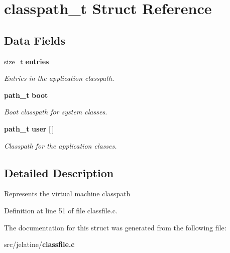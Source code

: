 \section{classpath\_\-t Struct Reference}
\label{structclasspath__t}
\subsection*{Data Fields}
\begin{DoxyCompactItemize}
\item 
size\_\-t {\bf entries}\label{structclasspath__t_ad21b3dca8d33e8d603933b3ad177163b}

\begin{DoxyCompactList}\small\item\em Entries in the application classpath. \item\end{DoxyCompactList}\item 
{\bf path\_\-t} {\bf boot}\label{structclasspath__t_a46b2205c768a84f648b385339d0ca0b0}

\begin{DoxyCompactList}\small\item\em Boot classpath for system classes. \item\end{DoxyCompactList}\item 
{\bf path\_\-t} {\bf user} [$\,$]\label{structclasspath__t_ac763ff9ce2a55c286c4aad498dc09477}

\begin{DoxyCompactList}\small\item\em Classpath for the application classes. \item\end{DoxyCompactList}\end{DoxyCompactItemize}


\subsection{Detailed Description}
Represents the virtual machine classpath 

Definition at line 51 of file classfile.c.



The documentation for this struct was generated from the following file:\begin{DoxyCompactItemize}
\item 
src/jelatine/{\bf classfile.c}\end{DoxyCompactItemize}
